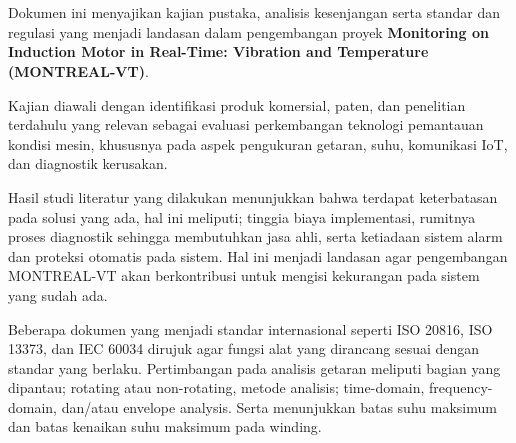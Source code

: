 \documentclass{elsinta}
\begin{document}
\coverpage
\newpage




\clearpage
{}
\setcounter{page}{1} 
\pagestyle{myfooter} %


\tableofcontents
\newpage
\section*{\docsumary}
Dokumen ini menyajikan kajian pustaka, analisis kesenjangan serta standar dan regulasi yang menjadi landasan dalam pengembangan proyek \textbf{Monitoring on Induction Motor in Real-Time: Vibration and Temperature (MONTREAL-VT)}.

Kajian diawali dengan identifikasi produk
komersial, paten, dan penelitian terdahulu 
yang relevan sebagai evaluasi perkembangan 
teknologi pemantauan kondisi mesin, khususnya 
pada aspek pengukuran getaran, suhu, 
komunikasi IoT, dan diagnostik kerusakan.

Hasil studi literatur yang dilakukan menunjukkan bahwa
terdapat keterbatasan pada solusi yang ada,
hal ini meliputi; tinggia biaya implementasi,
rumitnya proses diagnostik sehingga membutuhkan
jasa ahli, serta ketiadaan
sistem alarm dan proteksi otomatis pada sistem.
Hal ini menjadi landasan agar pengembangan MONTREAL-VT
akan berkontribusi untuk mengisi kekurangan pada sistem yang sudah ada.

Beberapa dokumen yang menjadi standar internasional seperti
ISO 20816, ISO 13373, dan IEC 60034 dirujuk agar fungsi
alat yang dirancang sesuai dengan standar yang berlaku. 
Pertimbangan pada analisis getaran meliputi bagian yang dipantau;
rotating atau non-rotating, metode analisis; time-domain, frequency-domain,
dan/atau envelope analysis. Serta menunjukkan batas suhu maksimum
dan batas kenaikan suhu maksimum pada winding.
\end{document}

